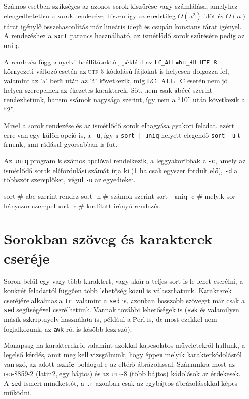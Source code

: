 Számos esetben szükséges az azonos sorok kiszűrése vagy számlálása, amelyhez
elengedhetetlen a sorok rendezése, hiszen így az eredetileg $O(n^2)$ időt és
$O(n)$ tárat igénylő összehasonlítás már lineáris idejű és csupán konstans tárat
igényel. A rendezéshez a \texttt{sort} parancs használható, az ismétlődő sorok
szűrésére pedig az \texttt{uniq}.

A rendezés függ a nyelvi beállításoktól, például az
\texttt{LC\_ALL=hu\_HU.UTF-8} környezeti változó esetén az \textsc{utf-8}
kódolású fájlokat is helyesen dolgozza fel, valamint az 'a' betű után az 'á'
következik, míg \textsc{LC\_ALL=C} esetén nem jó helyen szerepelnek az ékezetes
karakterek. Sőt, nem csak ábécé szerint rendezhetünk, hanem számok nagysága
szerint, így nem a ``10'' után következik a ``2''. 

Mivel a sorok rendezése és az ismétlődő sorok elhagyása gyakori feladat, ezért
erre van egy külön opció is, a \texttt{-u}, így a \texttt{sort | uniq} helyett
elegendő \texttt{sort -u}-t írnunk, ami rádásul gyorsabban is fut.

Az \texttt{uniq} program is számos opcióval rendelkezik, a leggyakoribbak a
\texttt{-c}, amely az ismétlődő sorok előfordulási számát írja ki (1 ha csak
egyszer fordult elő), \texttt{-d} a többször szereplőket, végül \texttt{-u} az
egyedieket.

\begin{VerbExample}
sort            # abc szerint rendez
sort -n         # számok szerint
sort | uniq -c  # melyik sor hányszor szerepel
sort -r         # fordított irányú rendezés
\end{VerbExample}


\section{Sorokban szöveg és karakterek cseréje}
\label{sec:filters-replace}

Soron belül egy vagy több karaktert, vagy akár a teljes sort is le lehet
cserélni, a konkrét feladattól függően több lehetőség közül is
választhatunk. Karakterek cseréjére alkalmas a \texttt{tr}, valamint a
\texttt{sed} is, azonban hosszabb szöveget már csak a \texttt{sed} segítségével
cserélhetünk. Vannak további lehetőségek is (\texttt{awk} és valamilyen másik
szkriptnyelv használata is, például a Perl \cite{perl} is, de most ezekkel nem
foglalkozunk, az \texttt{awk}-ról is később lesz szó).

Manapság ha karakterekről valamint azokkal kapcsolatos műveletekről hallunk, a
legelső kérdés, amit meg kell vizsgálnunk, hogy éppen melyik karakterkódolásról
van szó, az adott eszköz boldogul-e az eltérő ábrázolással. Számunkra most az
\textsc{iso-8859-2} (latin2, egy bájtos) és az \textsc{utf-8} (több bájtos)
kódolások az érdekesek. A \texttt{sed} ismeri mindkettőt, a \texttt{tr} azonban
csak az egybájtos ábrázolásokkal képes működni.


